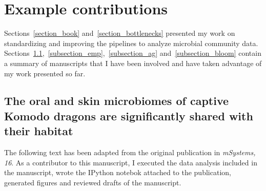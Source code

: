 \section{Example contributions}\label{section_contributions}

Sections~\ref{section_book} and~\ref{section_bottlenecks} presented my work
on standardizing and improving the pipelines to analyze microbial community data.
Sections~\ref{subsection_komodo},~\ref{subsection_emp},~\ref{subsection_ag}
and~\ref{subsection_bloom} contain a summary of manuscripts that I have been
involved and have taken advantage of my work presented so far.

\subsection{The oral and skin microbiomes of captive Komodo dragons are significantly shared with their habitat}\label{subsection_komodo}

The following text has been adapted from the original publication in
\textsl{mSystems, 16}. As a contributor to this manuscript, I executed the data
analysis included in the manuscript, wrote the IPython notebok \cite{Perez2007}
attached to the publication, generated figures and reviewed drafts of the manuscript.

